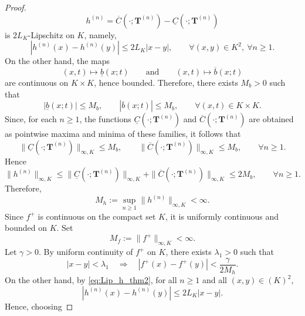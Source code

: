 \documentclass[review]{elsarticle}
\begin{document}
{\begin{proof}
\begin{equation}
h^{(n)}=\overline C(\cdot;\mathbf T^{(n)})-\underline C(\cdot;\mathbf T^{(n)})
\end{equation}
is $2L_K$-Lipschitz on $K$, namely,
\begin{equation}
|h^{(n)}(x)-h^{(n)}(y)|\le 2L_K|x-y|,
\qquad \forall (x,y)\in K^2,\ \forall n\ge 1.
\label{eq:Lip_h_thm2}
\end{equation}
On the other hand, the maps
\begin{equation}
(x,t)\mapsto \underline b(x;t)
\qquad\text{and}\qquad
(x,t)\mapsto \overline b(x;t)
\end{equation}
are continuous on $K\times K$, hence bounded. Therefore, there exists $M_b>0$ such that
\begin{equation}
|\underline b(x;t)|\le M_b,
\qquad
|\overline b(x;t)|\le M_b,
\qquad \forall (x,t)\in K\times K.
\end{equation}
Since, for each $n\ge 1$, the functions $\underline C(\cdot;\mathbf T^{(n)})$ and $\overline C(\cdot;\mathbf T^{(n)})$ are obtained as pointwise maxima and minima of these families, it follows that
\begin{equation}
\|\underline C(\cdot;\mathbf T^{(n)})\|_{\infty,K}\le M_b,
\qquad
\|\overline C(\cdot;\mathbf T^{(n)})\|_{\infty,K}\le M_b,
\qquad \forall n\ge 1.
\end{equation}
Hence
\begin{equation}
\|h^{(n)}\|_{\infty,K}
\le
\|\underline C(\cdot;\mathbf T^{(n)})\|_{\infty,K}
+
\|\overline C(\cdot;\mathbf T^{(n)})\|_{\infty,K}
\le 2M_b,
\qquad \forall n\ge 1.
\end{equation}
Therefore,
\begin{equation}
M_h:=\sup_{n\ge 1}\|h^{(n)}\|_{\infty,K}<\infty.
\end{equation}
%
Since $f^+$ is continuous on the compact set $K$, it is uniformly continuous and bounded on $K$. Set
\begin{equation}
M_f:=\|f^+\|_{\infty,K}<\infty.
\end{equation}
Let $\gamma>0$. By uniform continuity of $f^+$ on $K$, there exists $\lambda_1>0$ such that
\begin{equation}
|x-y|<\lambda_1
\quad\Longrightarrow\quad
|f^+(x)-f^+(y)|<\frac{\gamma}{2M_h}.
\end{equation}
On the other hand, by \eqref{eq:Lip_h_thm2}, for all $n\ge 1$ and all $(x,y)\in (K)^2$,
\begin{equation}
|h^{(n)}(x)-h^{(n)}(y)|\le 2L_K|x-y|.
\end{equation}
Hence, choosing

\end{proof}}
\end{document}
